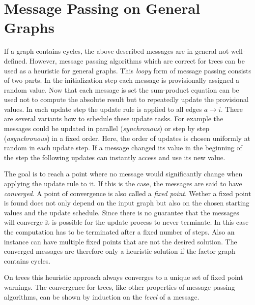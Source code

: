 \section{Message Passing on General Graphs}
If a graph contains cycles, the above described messages are in general not well-defined. However, message passing algorithms which are correct for trees can be used as a heuristic for general graphs. \newline
This \emph{loopy} form of message passing consists of two parts. In the initialization  step each message is provisionally assigned a random value. Now that each message is set the sum-product equation can be used not to compute the absolute result but to repeatedly update the provisional values. In each update step the update rule is applied to all edges $a \rightarrow i$. There are several variants how to schedule these update tasks. For example the messages could be updated in parallel (\emph{synchronous}) or step by step (\emph{asynchronous}) in a fixed order. Here, the order of updates is chosen uniformly at random in each update step. If a message changed its value in the beginning of the step the following updates can instantly access and use its new value. 

The goal is to reach a point where no message would significantly change when applying the update rule to it. If this is the case, the messages are said to have \emph{converged}. A point of convergence is also called a \emph{fixed point}. Wether a fixed point is found  does not only depend on the input graph but also on the chosen starting values and the update schedule. Since there is no guarantee that the messages will converge it is possible for the update process to never terminate. In this case the computation has to be terminated after a fixed number of steps. Also an instance can have multiple fixed points that are not the desired solution. The converged messages are therefore only a heuristic solution if the factor graph contains cycles.


On trees this heuristic approach always converges to a unique set of fixed point warnings. The convergence for trees, like other properties of message passing algorithms, can be shown by induction on the \textit{level} of a message.

